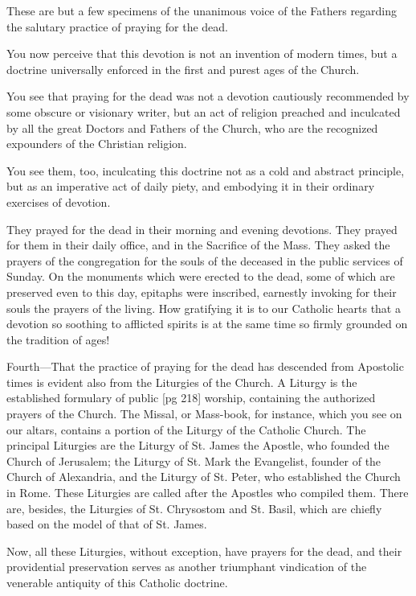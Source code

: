 These are but a few specimens of the unanimous
voice of the Fathers regarding the salutary
practice of praying for the dead.

You now perceive that this devotion is not an
invention of modern times, but a doctrine universally
enforced in the first and purest ages of
the Church.

You see that praying for the dead was not a
devotion cautiously recommended by some obscure
or visionary writer, but an act of religion
preached and inculcated by all the great Doctors
and Fathers of the Church, who are the recognized
expounders of the Christian religion.

You see them, too, inculcating this doctrine not
as a cold and abstract principle, but as an imperative
act of daily piety, and embodying it in their
ordinary exercises of devotion.

They prayed for the dead in their morning and
evening devotions. They prayed for them in their
daily office, and in the Sacrifice of the Mass. They
asked the prayers of the congregation for the
souls of the deceased in the public services of
Sunday. On the monuments which were erected
to the dead, some of which are preserved even to
this day, epitaphs were inscribed, earnestly invoking
for their souls the prayers of the living.
How gratifying it is to our Catholic hearts that
a devotion so soothing to afflicted spirits is at
the same time so firmly grounded on the tradition
of ages!

Fourth—That the practice of praying for the
dead has descended from Apostolic times is evident
also from the Liturgies of the Church. A
Liturgy is the established formulary of public
[pg 218]
worship, containing the authorized prayers of the
Church. The Missal, or Mass-book, for instance,
which you see on our altars, contains a portion
of the Liturgy of the Catholic Church. The principal
Liturgies are the Liturgy of St. James the
Apostle, who founded the Church of Jerusalem;
the Liturgy of St. Mark the Evangelist, founder
of the Church of Alexandria, and the Liturgy of
St. Peter, who established the Church in Rome.
These Liturgies are called after the Apostles who
compiled them. There are, besides, the Liturgies
of St. Chrysostom and St. Basil, which are chiefly
based on the model of that of St. James.

Now, all these Liturgies, without exception,
have prayers for the dead, and their providential
preservation serves as another triumphant vindication
of the venerable antiquity of this Catholic
doctrine.

